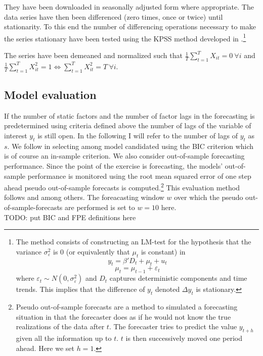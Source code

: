 \documentclass[11pt]{article}
\begin{document}
They have been downloaded in seasonally adjusted form where appropriate. The data series have then been differenced (zero times, once or twice) until stationarity. To this end the number of differencing operations necessary to make the series stationary have been tested using the KPSS method developed in \citet{kwiatkowski1992testing}.\footnote{The method consists of constructing an LM-test for the hypothesis that the variance $\sigma^2_\varepsilon$ is 0 (or equivalently that $\mu_t$ is constant) in $$y_t = \beta'D_t + \mu_t + u_t$$ $$\mu_t = \mu_{t-1} + \varepsilon_t$$ where $\varepsilon_t \sim N(0, \sigma^2_\varepsilon)$ and $D_t$ captures deterministic components and time trends. This implies that the difference of $y_t$ denoted $\Delta y_t$ is stationary.}

The series have been demeaned and normalized such that $\frac{1}{T}\sum_{t=1}^T X_{it} = 0 \ \forall i$ and $\frac{1}{T}\sum_{t=1}^T X_{it}^2 = 1 \Leftrightarrow \sum_{t=1}^T X_{it}^2 = T \ \forall i$. \\

\subsection{Model evaluation}
If the number of static factors and the number of factor lags in the forecasting is predetermined using criteria defined above the number of lags  of the variable of interest $y_t$ is still open. In the following I will refer to the number of lags of $y_t$ as $s$. We follow \citet{bai2008forecasting} in selecting among model candidated using the BIC criterion which is of course an in-sample criterion. We also consider out-of-sample forecasting performance. Since the point of the exercise is forecasting, the models' out-of-sample performance is monitored using the root mean squared error of one step ahead pseudo out-of-sample forecasts is computed.\footnote{Pseudo out-of-sample forecasts are a method to simulated a forecasting situation in that the forecaster does as if he would not know the true realizations of the data after $t$. The forecaster tries to predict the value $y_{t+h}$ given all the information up to $t$. $t$ is then successively moved one period ahead. Here we set $h=1$.} This evaluation method follows \citet{forni2005the} and \citet{bai2008forecasting} among others. The foreacasting window $w$ over which the pseudo out-of-sample-forecasts are performed is set to $w=10$ here. \\

TODO: put BIC and FPE definitions here
\end{document}
